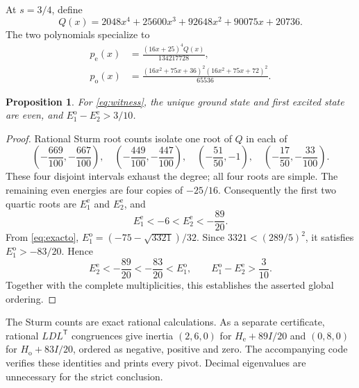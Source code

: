 \documentclass[11pt]{article}
\newcommand{\Ee}{E^{\mathrm e}}
\newcommand{\Eo}{E^{\mathrm o}}
\newtheorem{proposition}{Proposition}
\begin{document}
At $s=3/4$, define
\begin{equation}
 Q(x)=2048x^4+25600x^3+92648x^2+90075x+20736.
\end{equation}
The two polynomials specialize to
\begin{align}
 p_{\mathrm e}(x)&=\frac{(16x+25)^4Q(x)}{134217728},\label{eq:exacte}\\
 p_{\mathrm o}(x)&=\frac{(16x^2+75x+36)^2(16x^2+75x+72)^2}{65536}.
 \label{eq:exacto}
\end{align}

\begin{proposition}
For \eqref{eq:witness}, the unique ground state and first excited state are even, and $\Eo_1-\Ee_2>3/10$.
\end{proposition}
\begin{proof}
Rational Sturm root counts isolate one root of $Q$ in each of
\begin{equation}
 \left(-\frac{669}{100},-\frac{667}{100}\right),\quad
 \left(-\frac{449}{100},-\frac{447}{100}\right),\quad
 \left(-\frac{51}{50},-1\right),\quad
 \left(-\frac{17}{50},-\frac{33}{100}\right).
 \label{eq:intervals}
\end{equation}
These four disjoint intervals exhaust the degree; all four roots are simple. The remaining even energies are four copies of $-25/16$. Consequently the first two quartic roots are $\Ee_1$ and $\Ee_2$, and
\begin{equation}
 \Ee_1<-6<\Ee_2<-\frac{89}{20}.
\end{equation}
From \eqref{eq:exacto}, $\Eo_1=(-75-\sqrt{3321})/32$. Since $3321<(289/5)^2$, it satisfies $\Eo_1>-83/20$. Hence
\begin{equation}
 \Ee_2<-\frac{89}{20}<-\frac{83}{20}<\Eo_1,\qquad
 \Eo_1-\Ee_2>\frac3{10}.
 \label{eq:ordering}
\end{equation}
Together with the complete multiplicities, this establishes the asserted global ordering.
\end{proof}

The Sturm counts are exact rational calculations. As a separate certificate, rational $LDL^{\mathsf T}$ congruences give inertia $(2,6,0)$ for $H_{\mathrm e}+89I/20$ and $(0,8,0)$ for $H_{\mathrm o}+83I/20$, ordered as negative, positive and zero. The accompanying code verifies these identities and prints every pivot. Decimal eigenvalues are unnecessary for the strict conclusion.
\end{document}
